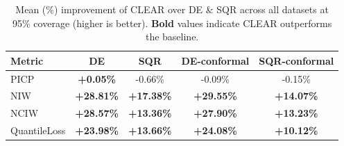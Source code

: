 \begin{table}[!htbp]
\centering
\caption{Mean (\%) improvement of CLEAR over DE \& SQR across all datasets at 95\% coverage (higher is better). \textbf{Bold} values indicate CLEAR outperforms the baseline.}
\label{tab:clear_percentage_improvement}
\small
\begin{tabular}{lcccc}
\toprule
Metric & DE & SQR & DE-conformal & SQR-conformal \\
\midrule
PICP & \textbf{+0.05\%} & -0.66\% & -0.09\% & -0.15\% \\
NIW & \textbf{+28.81\%} & \textbf{+17.38\%} & \textbf{+29.55\%} & \textbf{+14.07\%} \\
NCIW & \textbf{+28.57\%} & \textbf{+13.36\%} & \textbf{+27.90\%} & \textbf{+13.23\%} \\
QuantileLoss & \textbf{+23.98\%} & \textbf{+13.66\%} & \textbf{+24.08\%} & \textbf{+10.12\%} \\
\bottomrule
\end{tabular}
\end{table}